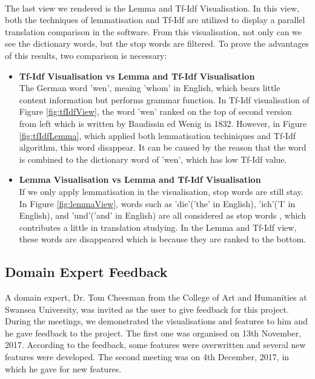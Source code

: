 \paragraph[]{} The last view we rendered is the Lemma and Tf-Idf Visualisation. In this view, both the techniques of lemmatisation and Tf-Idf are utilized to display a parallel translation comparison in the software. From this visualisation, not only can we see the dictionary words, but the stop words are filtered. To prove the advantages of this results, two comparison is necessary:
\begin{itemize} 	
	\item \textbf{Tf-Idf Visualisation vs Lemma and Tf-Idf Visualisation}\\
     The German word 'wen', meaing 'whom' in English, which bears little content information but performs grammar function. In Tf-Idf visualisation of Figure  \ref{fig:tfIdfView}, the word 'wen' ranked on the top of second version from left which is written by Baudissin ed Wenig in 1832\cite{Hotho2005}. However, in Figure \ref{fig:tfIdfLemma}, which applied both lemmatisation techiniques and Tf-Idf algorithm, this word disappear. It can be caused by the reason that the word is combined to the dictionary word of 'wen', which has low Tf-Idf value.
	\item \textbf{Lemma Visualisation vs Lemma and Tf-Idf Visualisation}\\
	If we only apply lemmatisation in the visualisation, stop words are still stay. In Figure \ref{fig:lemmaView}, words such as 'die'('the' in English), 'ich'('I' in English), and 'und'('and' in English) are all considered as stop words \cite{Hotho2005}, which contributes a little in translation studying. In the Lemma and Tf-Idf view, these words are disappeared which is because they are ranked to the bottom. 
\end{itemize}

\subsection{Domain Expert Feedback}

A domain expert, Dr. Tom Cheesman from the College of Art and Humanities at Swansea University, was invited as the user to give feedback for this project. During the meetings, we demonstrated the visualisations and features to him and he gave feedback to the project. The first one was organised on 13th November, 2017. According to the feedback, some features were overwritten and several new features were developed. The second meeting was on 4th December, 2017, in which he gave for new features. 

